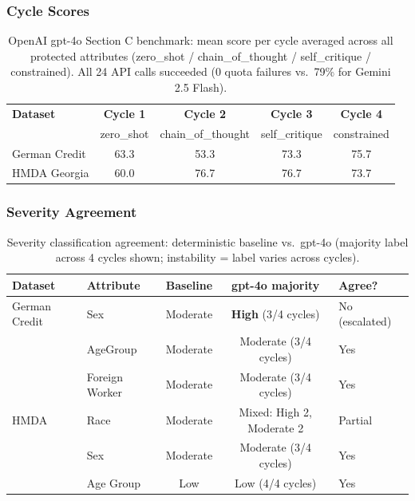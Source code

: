 \documentclass[11pt,a4paper]{article}
\begin{document}
\subsubsection{Cycle Scores}

\begin{table}[H]
\centering
\caption{OpenAI gpt-4o Section C benchmark: mean score per cycle averaged across all
         protected attributes (zero\_shot / chain\_of\_thought / self\_critique / constrained).
         All 24 API calls succeeded (0 quota failures vs.\ 79\% for Gemini 2.5 Flash).}
\label{tab:openai-cycles}
\begin{tabular}{lcccc}
\toprule
\textbf{Dataset} & \textbf{Cycle 1} & \textbf{Cycle 2} & \textbf{Cycle 3} & \textbf{Cycle 4} \\
              & \small zero\_shot & \small chain\_of\_thought & \small self\_critique & \small constrained \\
\midrule
German Credit & 63.3 & 53.3 & 73.3 & 75.7 \\
HMDA Georgia  & 60.0 & 76.7 & 76.7 & 73.7 \\
\bottomrule
\end{tabular}
\end{table}

\subsubsection{Severity Agreement}

\begin{table}[H]
\centering
\caption{Severity classification agreement: deterministic baseline vs.\ gpt-4o
         (majority label across 4 cycles shown; instability = label varies across cycles).}
\label{tab:severity}
\begin{tabular}{llccl}
\toprule
\textbf{Dataset} & \textbf{Attribute} & \textbf{Baseline} & \textbf{gpt-4o majority} & \textbf{Agree?} \\
\midrule
German Credit & Sex              & Moderate & \textbf{High} (3/4 cycles)   & No (escalated) \\
              & AgeGroup         & Moderate & Moderate (3/4 cycles)        & Yes \\
              & Foreign Worker   & Moderate & Moderate (3/4 cycles)        & Yes \\
\midrule
HMDA          & Race             & Moderate & Mixed: High 2, Moderate 2    & Partial \\
              & Sex              & Moderate & Moderate (3/4 cycles)        & Yes \\
              & Age Group        & Low      & Low (4/4 cycles)             & Yes \\
\bottomrule
\end{tabular}
\end{table}
\end{document}
